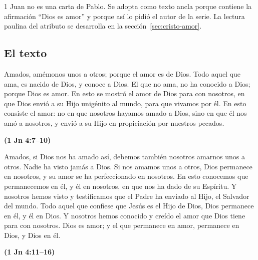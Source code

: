 \documentclass[11pt,letterpaper]{article}
\newcommand{\fuente}[1]{\par\hfill{\upshape\bfseries\small\textcolor{azul}{#1}}}
\begin{document}
\begin{nota}[Precisión]
1 Juan no es una carta de Pablo. Se adopta como texto ancla porque contiene la afirmación ``Dios es amor'' y porque así lo pidió el autor de la serie. La lectura paulina del atributo se desarrolla en la sección~\ref{sec:cristo-amor}.
\end{nota}

\subsection{El texto}
\begin{cita}Amados, amémonos unos a otros; porque el amor es de Dios. Todo aquel que ama, es nacido de Dios, y conoce a Dios. El que no ama, no ha conocido a Dios; porque Dios es amor. En esto se mostró el amor de Dios para con nosotros, en que Dios envió a su Hijo unigénito al mundo, para que vivamos por él. En esto consiste el amor: no en que nosotros hayamos amado a Dios, sino en que él nos amó a nosotros, y envió a su Hijo en propiciación por nuestros pecados.\fuente{(1 Jn 4:7--10)}\end{cita}

\begin{cita}Amados, si Dios nos ha amado así, debemos también nosotros amarnos unos a otros. Nadie ha visto jamás a Dios. Si nos amamos unos a otros, Dios permanece en nosotros, y su amor se ha perfeccionado en nosotros. En esto conocemos que permanecemos en él, y él en nosotros, en que nos ha dado de su Espíritu. Y nosotros hemos visto y testificamos que el Padre ha enviado al Hijo, el Salvador del mundo. Todo aquel que confiese que Jesús es el Hijo de Dios, Dios permanece en él, y él en Dios. Y nosotros hemos conocido y creído el amor que Dios tiene para con nosotros. Dios es amor; y el que permanece en amor, permanece en Dios, y Dios en él.\fuente{(1 Jn 4:11--16)}\end{cita}
\end{document}
